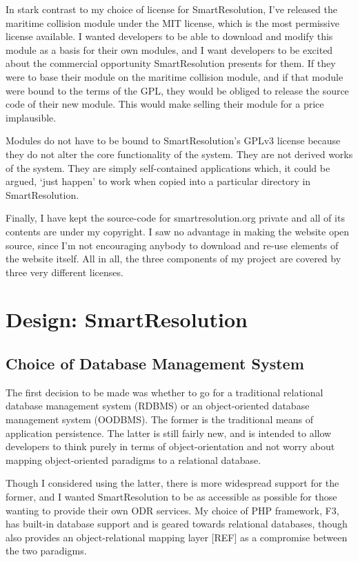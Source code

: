 In stark contrast to my choice of license for SmartResolution, I've released the maritime collision module under the MIT license, which is the most permissive license available. I wanted developers to be able to download and modify this module as a basis for their own modules, and I want developers to be excited about the commercial opportunity SmartResolution presents for them. If they were to base their module on the maritime collision module, and if that module were bound to the terms of the GPL, they would be obliged to release the source code of their new module. This would make selling their module for a price implausible.

Modules do not have to be bound to SmartResolution's GPLv3 license because they do not alter the core functionality of the system. They are not derived works of the system. They are simply self-contained applications which, it could be argued, `just happen' to work when copied into a particular directory in SmartResolution.

Finally, I have kept the source-code for smartresolution.org private and all of its contents are under my copyright. I saw no advantage in making the website open source, since I'm not encouraging anybody to download and re-use elements of the website itself. All in all, the three components of my project are covered by three very different licenses.

\section{Design: SmartResolution}

\subsection{Choice of Database Management System}

The first decision to be made was whether to go for a traditional relational database management system (RDBMS) or an object-oriented database management system (OODBMS). The former is the traditional means of application persistence. The latter is still fairly new, and is intended to allow developers to think purely in terms of object-orientation and not worry about mapping object-oriented paradigms to a relational database.

Though I considered using the latter, there is more widespread support for the former, and I wanted SmartResolution to be as accessible as possible for those wanting to provide their own ODR services. My choice of PHP framework, F3, has built-in database support and is geared towards relational databases, though also provides an object-relational mapping layer [REF] as a compromise between the two paradigms. %

